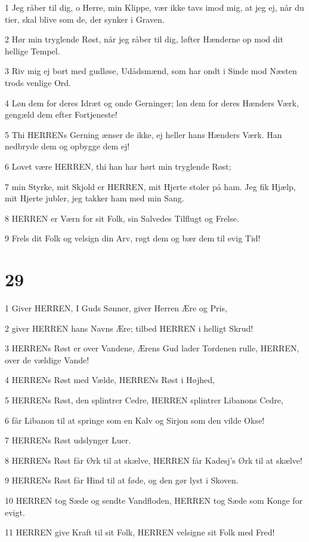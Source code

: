 \par 1 Jeg råber til dig, o Herre, min Klippe, vær ikke tavs imod mig, at jeg ej, når du tier, skal blive som de, der synker i Graven.
\par 2 Hør min tryglende Røst, når jeg råber til dig, løfter Hænderne op mod dit hellige Tempel.
\par 3 Riv mig ej bort med gudløse, Udådsmænd, som har ondt i Sinde mod Næsten trods venlige Ord.
\par 4 Løn dem for deres Idræt og onde Gerninger; løn dem for deres Hænders Værk, gengæld dem efter Fortjeneste!
\par 5 Thi HERRENs Gerning ænser de ikke, ej heller hans Hænders Værk. Han nedbryde dem og opbygge dem ej!
\par 6 Lovet være HERREN, thi han har hørt min tryglende Røst;
\par 7 min Styrke, mit Skjold er HERREN, mit Hjerte stoler på ham. Jeg fik Hjælp, mit Hjerte jubler, jeg takker ham med min Sang.
\par 8 HERREN er Værn for sit Folk, sin Salvedes Tilflugt og Frelse.
\par 9 Frels dit Folk og velsign din Arv, røgt dem og bær dem til evig Tid!

\chapter{29}

\par 1 Giver HERREN, I Guds Sønner, giver Herren Ære og Pris,
\par 2 giver HERREN hans Navns Ære; tilbed HERREN i helligt Skrud!
\par 3 HERRENs Røst er over Vandene, Ærens Gud lader Tordenen rulle, HERREN, over de vældige Vande!
\par 4 HERRENs Røst med Vælde, HERRENs Røst i Højhed,
\par 5 HERRENs Røst, den splintrer Cedre, HERREN splintrer Libanons Cedre,
\par 6 får Libanon til at springe som en Kalv og Sirjon som den vilde Okse!
\par 7 HERRENs Røst udslynger Luer.
\par 8 HERRENs Røst får Ørk til at skælve, HERREN får Kadesj's Ørk til at skælve!
\par 9 HERRENs Røst får Hind til at føde, og den gør lyst i Skoven.
\par 10 HERREN tog Sæde og sendte Vandfloden, HERREN tog Sæde som Konge for evigt.
\par 11 HERREN give Kraft til sit Folk, HERREN velsigne sit Folk med Fred!

